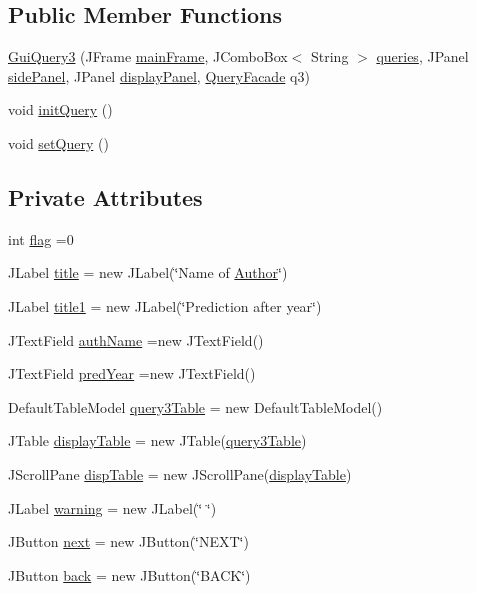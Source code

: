 \subsection*{Public Member Functions}
\begin{DoxyCompactItemize}
\item 
\hyperlink{classGuiQuery3_a6abf4556ef8602ed3f6151439965841f}{Gui\+Query3} (J\+Frame \hyperlink{classGUIQuery_aba988b5bec899d53480a472de7b87dfa}{main\+Frame}, J\+Combo\+Box$<$ String $>$ \hyperlink{classGUIQuery_a0db8bd960b4512cadf9aa40642934680}{queries}, J\+Panel \hyperlink{classGUIQuery_a70e233b1f14874166b7707edebe825d2}{side\+Panel}, J\+Panel \hyperlink{classGUIQuery_a8b4dbf257e0859c597591f072349b75c}{display\+Panel}, \hyperlink{classQueryFacade}{Query\+Facade} q3)
\item 
void \hyperlink{classGuiQuery3_a6d7a0d2ab524cd98ed76495e80f810cc}{init\+Query} ()
\item 
void \hyperlink{classGuiQuery3_afba341da96f35e822f6da33e9eca9941}{set\+Query} ()
\end{DoxyCompactItemize}
\subsection*{Private Attributes}
\begin{DoxyCompactItemize}
\item 
int \hyperlink{classGuiQuery3_acf9c75dae1db9c0c40a25d88137cb372}{flag} =0
\item 
J\+Label \hyperlink{classGuiQuery3_a7e581a0af7c5a7aafe78127499af4ea6}{title} = new J\+Label(\char`\"{}Name of \hyperlink{classAuthor}{Author}\char`\"{})
\item 
J\+Label \hyperlink{classGuiQuery3_a9edee5c70fc9ce109601436c5556675f}{title1} = new J\+Label(\char`\"{}Prediction after year\char`\"{})
\item 
J\+Text\+Field \hyperlink{classGuiQuery3_aa3273681bd3a7b3b44b36fd2b2fddcd4}{auth\+Name} =new J\+Text\+Field()
\item 
J\+Text\+Field \hyperlink{classGuiQuery3_afedb6af40be4ff198922c85bbe94716f}{pred\+Year} =new J\+Text\+Field()
\item 
Default\+Table\+Model \hyperlink{classGuiQuery3_a8273c6d7086d34e6f91fc9721af410d9}{query3\+Table} = new Default\+Table\+Model()
\item 
J\+Table \hyperlink{classGuiQuery3_a868222082fb015a87bac64a3c671389d}{display\+Table} = new J\+Table(\hyperlink{classGuiQuery3_a8273c6d7086d34e6f91fc9721af410d9}{query3\+Table})
\item 
J\+Scroll\+Pane \hyperlink{classGuiQuery3_acd36b4ab5f212d4a4fae20d4a8ffcba4}{disp\+Table} = new J\+Scroll\+Pane(\hyperlink{classGuiQuery3_a868222082fb015a87bac64a3c671389d}{display\+Table})
\item 
J\+Label \hyperlink{classGuiQuery3_a2452813fd6a5ff8c945ccadde7ad4853}{warning} = new J\+Label(\char`\"{} \char`\"{})
\item 
J\+Button \hyperlink{classGuiQuery3_a4d7e8b050499e731a78c43d9c41782e6}{next} = new J\+Button(\char`\"{}N\+E\+XT\char`\"{})
\item 
J\+Button \hyperlink{classGuiQuery3_aa545da5c2e8152ea18c51297734a6910}{back} = new J\+Button(\char`\"{}B\+A\+CK\char`\"{})
\end{DoxyCompactItemize}
